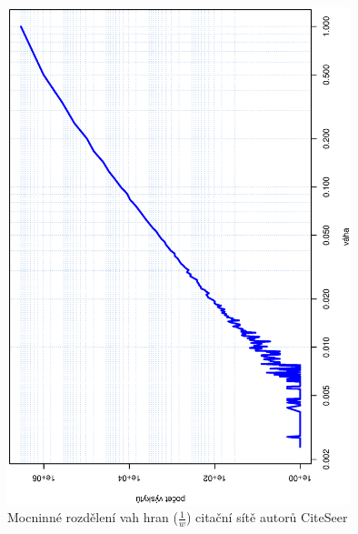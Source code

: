 \documentclass{bakalarka}
\begin{document}
\begin{figure}[!ht]
\centering
	\includegraphics[width=10cm,angle=270]{ewd_citeseer.eps}
	\caption{Mocninné rozdělení vah hran ($\frac{1}{w}$) citační sítě autorů CiteSeer}
	\label{fig:scalefreeciteseer}
\end{figure}


\end{document}
